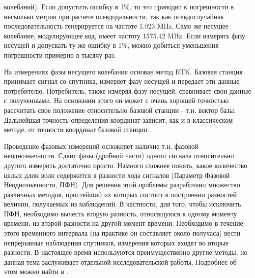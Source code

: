 \documentclass[a4paper,12pt]{report}
\begin{document}
колебаний). Если допустить ошибку в 1\%, то это приводит к погрешности в несколько метров при расчете псевдодальности, так как псевдослучайная 
последовательность генерируется на частоте 1.023 MHz. Само же несущее колебание, модулирующее код, имеет частоту 1575.42 MHz. Если измерять 
фазу несущей и допускать ту же ошибку в 1\%, можно добиться уменьшения погрешности примерно в тысячу раз. \par
На измерениях фазы несущего колебания основан метод RTK. Базовая станция принимает сигнал со спутника, измеряет фазу несущей и передает эти 
данные потребителю. Потребитель, также измеряя фазу несущей, сравнивает свои данные с полученными. На основании этого он может с очень хорошей 
точностью рассчитать свое положение относительно базовой станции - т.н. вектор базы. Дальнейшая точность определения координат зависит, как и 
в классическом методе, от точности координат базовой станции. \par
Проведение фазовых измерений осложняет наличие т.н. фазовой неоднозначности. Сдвиг фазы (дробной части) одного сигнала относительно другого 
измерить достаточно просто. Намного сложнее понять, какое количество целых длин волн содержится в разности хода сигналов (Параметр Фазовой 
Неоднозначности, ПФН). Для решения этой проблемы разработано множество различных методов, простейший их которых состоит в построении разностей 
величин, получаемых из наблюдений. В частности, для того, чтобы исключить ПФН, необходимо вычесть вторую разность, относящуюся к одному моменту 
времени, из второй разности на другой момент времени. Необходимо в течение этого временного интервала (на практике он составляет около 
получаса) вести непрерывные наблюдения спутников, измерения которых входят во вторые разности. В настоящее время используются 
преимущественно другие методы, но данная тема заслуживает отдельной исследовательской работы. Подробнее об этом можно найти в \cite{karut}.
\end{document}
